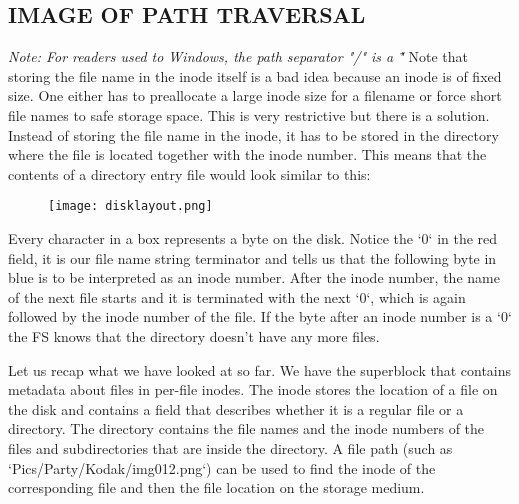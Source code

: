 \begin{enumerate}
\section{IMAGE OF PATH TRAVERSAL}

\textit{Note: For readers used to Windows, the path separator "/" is a "\"}
Note that storing the file name in the inode itself is a
bad idea because an inode is of fixed size. One either has to preallocate a large inode size for a filename
or force short file names to safe storage space. This is very restrictive but there is a solution.
Instead of storing the file name in the inode, it has to be stored in the directory where the file is located
together with the inode number. This means that the contents of a directory entry file would look similar 
to this:

\begin{figure}[h]
	\texttt{[image: disklayout.png]}
	\centering
\end{figure}

Every character in a box represents a byte on the disk. Notice the `0` in the red field,
it is our file name string terminator and tells us that the following byte in blue is to be interpreted
as an inode number. After the inode number, the name of the next file starts and it is terminated with the next `0`, which is again
followed by the inode number of the file. If the byte after an inode number is a `0` the FS knows
that the directory doesn't have any more files.

Let us recap what we have looked at so far.
We have the superblock that contains metadata about files in per-file inodes. The inode stores the
location of a file on the disk and contains a field that describes whether it is a regular file or a
directory. The directory contains the file names and the inode numbers of the files and subdirectories
that are inside the directory. A file path (such as `Pics/Party/Kodak/img012.png`) can
be used to find the inode of the corresponding file and then the file location on the storage medium.


\end{enumerate}
